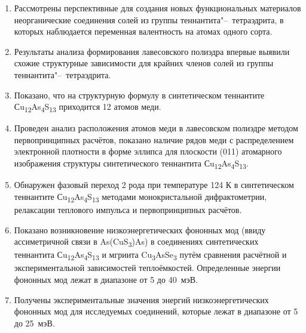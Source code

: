 \begin{enumerate}
						\item Рассмотрены перспективные для создания новых функциональных материалов неорганические соединения солей из группы теннантита"--~тетраэдрита, в которых наблюдается переменная валентность на атомах одного сорта.
						\item Результаты анализа формирования лавесовского полиэдра впервые выявили схожие структурные зависимости для крайних членов солей из группы теннантита"--~тетраэдрита.
						\item Показано, что на структурную формулу в синтетическом теннантите Сu\textsubscript{12}As\textsubscript{4}S\textsubscript{13} приходится 12 атомов меди.
						\item Проведен анализ расположения атомов меди в лавесовском полиэдре методом первопринципных расчётов, показано наличие рядов меди с распределением электронной плотности в форме эллипса для плоскости (011) атомарного изображения структуры синтетического теннантита Сu\textsubscript{12}As\textsubscript{4}S\textsubscript{13}.
						\item Обнаружен фазовый переход 2 рода при температуре 124 К в синтетическом теннантите Сu\textsubscript{12}As\textsubscript{4}S\textsubscript{13} методами монокристальной дифрактометрии, релаксации теплового импульса и  первопринципных расчётов.
						\item Показано возникновение низкоэнергетических фононных мод (ввиду  ассиметричной связи в As(CuS\textsubscript{3})As) в соединениях синтетических теннантита Сu\textsubscript{12}As\textsubscript{4}S\textsubscript{13} и мгриита Cu\textsubscript{3}AsSe\textsubscript{3} путём сравнения расчётной и экспериментальной зависимостей теплоёмкостей. Определенные энергии  фононных мод  лежат в диапазоне от 5 до 40~мэВ.
						\item Получены экспериментальные значения энергий низкоэнергетических фононных мод для исследуемых соединений, которые лежат в диапазоне от 5 до 25~мэВ.

\end{enumerate}
